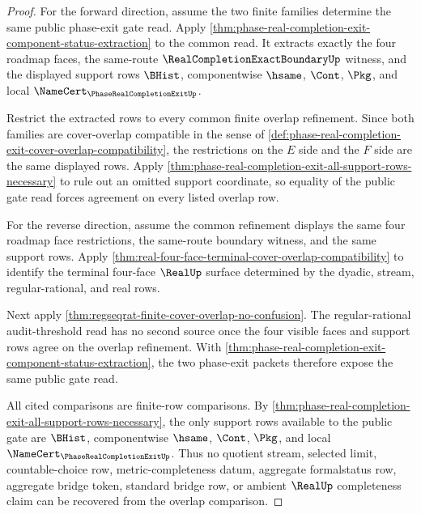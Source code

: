 \begin{proof}
For the forward direction, assume the two finite families determine the same public phase-exit gate read. Apply \autoref{thm:phase-real-completion-exit-component-status-extraction} to the common read. It extracts exactly the four roadmap faces, the same-route $\RealCompletionExactBoundaryUp$ witness, and the displayed support rows $\BHist$, componentwise $\hsame$, $\Cont$, $\Pkg$, and local $\NameCert_{\PhaseRealCompletionExitUp}$.

Restrict the extracted rows to every common finite overlap refinement. Since both families are cover-overlap compatible in the sense of \autoref{def:phase-real-completion-exit-cover-overlap-compatibility}, the restrictions on the $E$ side and the $F$ side are the same displayed rows. Apply \autoref{thm:phase-real-completion-exit-all-support-rows-necessary} to rule out an omitted support coordinate, so equality of the public gate read forces agreement on every listed overlap row.

For the reverse direction, assume the common refinement displays the same four roadmap face restrictions, the same-route boundary witness, and the same support rows. Apply \autoref{thm:real-four-face-terminal-cover-overlap-compatibility} to identify the terminal four-face $\RealUp$ surface determined by the dyadic, stream, regular-rational, and real rows.

Next apply \autoref{thm:regseqrat-finite-cover-overlap-no-confusion}. The regular-rational audit-threshold read has no second source once the four visible faces and support rows agree on the overlap refinement. With \autoref{thm:phase-real-completion-exit-component-status-extraction}, the two phase-exit packets therefore expose the same public gate read.

All cited comparisons are finite-row comparisons. By \autoref{thm:phase-real-completion-exit-all-support-rows-necessary}, the only support rows available to the public gate are $\BHist$, componentwise $\hsame$, $\Cont$, $\Pkg$, and local $\NameCert_{\PhaseRealCompletionExitUp}$. Thus no quotient stream, selected limit, countable-choice row, metric-completeness datum, aggregate formalstatus row, aggregate bridge token, standard bridge row, or ambient $\RealUp$ completeness claim can be recovered from the overlap comparison.
\end{proof}

